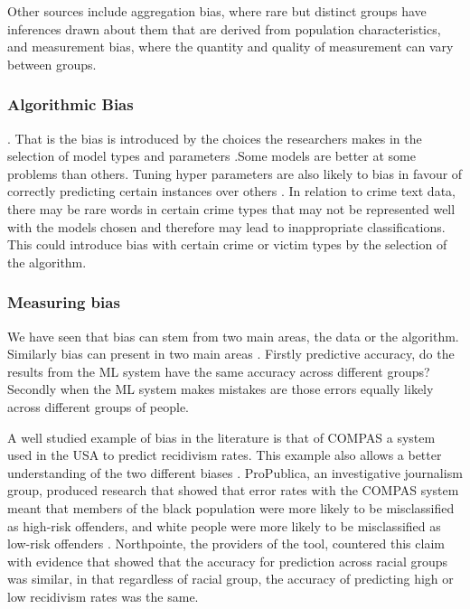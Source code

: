 Other sources include aggregation bias, where rare but distinct groups have inferences drawn about them that are derived from population characteristics, and measurement bias, where the quantity and quality of measurement can vary between groups.

\subsubsection{Algorithmic Bias}  \parencite{mehrabi2021survey}. That is the bias is introduced by the choices the researchers makes in the selection of model types and parameters \parencite{hooker2021moving}.Some models are better at some problems than others. Tuning hyper parameters are also likely to bias in favour of correctly predicting certain instances over others \parencite{paiva2022relating}. In relation to crime text data, there may be rare words in certain crime types that may not be represented well with the models chosen and therefore may lead to inappropriate classifications. This could introduce bias with certain crime or victim types by the selection of the algorithm.

\subsubsection{Measuring bias} We have seen that bias can stem from two main areas, the data or the algorithm. Similarly bias can present in two main areas \parencite{chouldechova2017fair}. Firstly predictive accuracy, do the results from the ML system have the same accuracy across different groups? Secondly when the ML system makes mistakes are those errors equally likely across different groups of people. 

A well studied example of bias in the literature is that of COMPAS a system used in the USA to predict recidivism rates. This example also allows a better understanding of the two different biases \parencite{kleinberg2016inherent, chouldechova2017fair}.  ProPublica, an investigative journalism group, produced research that showed that error rates with the COMPAS system meant that members of the black population were more likely to be misclassified as high-risk offenders, and white people were more likely to be misclassified as low-risk offenders   \parencite{jefflarson_2016}. Northpointe, the providers of the tool, countered this claim with evidence that showed that the accuracy for prediction across racial groups was similar, in that regardless of racial group, the accuracy of predicting high or low recidivism rates was the same.

